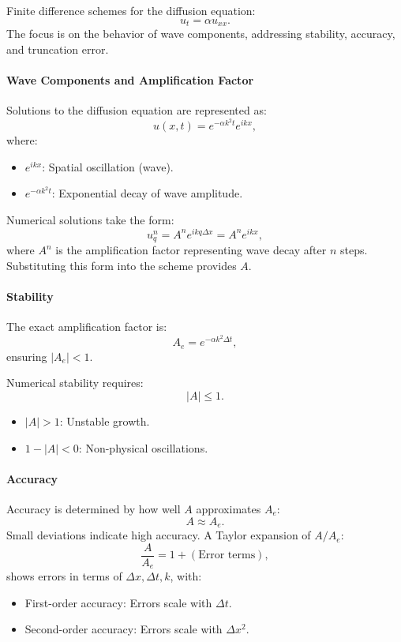 \documentclass{article}
\begin{document}
			Finite difference schemes for the diffusion equation:
			\[
			u_t = \alpha u_{xx}.
			\]
			The focus is on the behavior of wave components, addressing stability, accuracy, and truncation error.
			
			\paragraph{Wave Components and Amplification Factor}
			Solutions to the diffusion equation are represented as:
			\[
			u(x, t) = e^{-\alpha k^2 t} e^{i k x},
			\]
			where:
			\begin{itemize}
				\item \( e^{i k x} \): Spatial oscillation (wave).
				\item \( e^{-\alpha k^2 t} \): Exponential decay of wave amplitude.
			\end{itemize}
			
			Numerical solutions take the form:
			\[
			u_q^n = A^n e^{i k q \Delta x} = A^n e^{i k x},
			\]
			where \( A^n \) is the amplification factor representing wave decay after \( n \) steps. Substituting this form into the scheme provides \( A \).
			
			\paragraph{Stability}
			The exact amplification factor is:
			\[
			A_e = e^{-\alpha k^2 \Delta t},
			\]
			ensuring \( |A_e| < 1 \).
			
			Numerical stability requires:
			\[
			|A| \leq 1.
			\]
			\begin{itemize}
				\item \( |A| > 1 \): Unstable growth.
				\item \( 1 - |A| < 0 \): Non-physical oscillations.
			\end{itemize}
			
			\paragraph{Accuracy}
			Accuracy is determined by how well \( A \) approximates \( A_e \):
			\[
			A \approx A_e.
			\]
			Small deviations indicate high accuracy. A Taylor expansion of \( A / A_e \):
			\[
			\frac{A}{A_e} = 1 + (\text{Error terms}),
			\]
			shows errors in terms of \( \Delta x, \Delta t, k \), with:
			\begin{itemize}
				\item First-order accuracy: Errors scale with \( \Delta t \).
				\item Second-order accuracy: Errors scale with \( \Delta x^2 \).
			\end{itemize}
			
\end{document}
